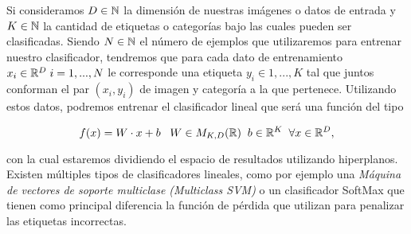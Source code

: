 Si consideramos $D \in \mathbb{N}$ la dimensión de nuestras imágenes o datos de entrada y $K \in \mathbb{N}$ la cantidad de etiquetas o categorías bajo las cuales pueden ser clasificadas. Siendo $N \in \mathbb{N}$ el número de ejemplos que utilizaremos para entrenar nuestro clasificador, tendremos que para cada dato de entrenamiento $x_i \in \mathbb{R}^D \; i=1,...,N$ le corresponde una etiqueta $y_i \in 1,...,K$ tal que juntos conforman el par $(x_i,y_i)$ de imagen y categoría a la que pertenece. Utilizando estos datos, podremos entrenar el clasificador lineal que será una función del tipo

$$f(x)=W\cdot x+ b\; \; \; W\in M_{K,D}(\mathbb{R}) \;\; b \in \mathbb{R}^K \;\; \forall x\in \mathbb{R}^D,$$

con la cual estaremos dividiendo el espacio de resultados utilizando hiperplanos. Existen múltiples tipos de clasificadores lineales, como por ejemplo una \emph{Máquina de vectores de soporte multiclase (Multiclass SVM)} o un clasificador SoftMax que tienen como principal diferencia la función de pérdida que utilizan para penalizar las etiquetas incorrectas.






